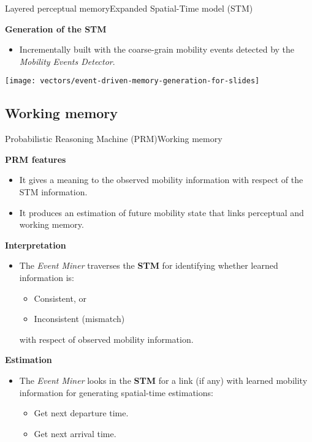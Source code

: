 \begin{frame}{Layered perceptual memory}{Expanded Spatial-Time model (STM)}
\small
\begin{block}{\small \textbf{Generation of the STM}}
\begin{itemize}
    \item Incrementally built with the coarse-grain mobility events detected by the \emph{Mobility Events Detector}.
\end{itemize}
{
  \centering
  \texttt{[image: vectors/event-driven-memory-generation-for-slides]}
  \par
}
\end{block}
\end{frame}

\subsection{Working memory}
\begin{frame}{Probabilistic Reasoning Machine (PRM)}{Working memory}
\small
\begin{block}{\small \textbf{PRM features}}
\begin{itemize}
    \item It gives a meaning to the observed mobility information with respect of the STM information.
    \item It produces an estimation of future mobility state that links perceptual and working memory.
\end{itemize}
\end{block}

\begin{block}{\small \textbf{Interpretation}}
\begin{itemize}
  \item The \emph{Event Miner} traverses the \textbf{STM} for identifying whether learned information is:
  \begin{itemize}
     \item Consistent, or
     \item Inconsistent (mismatch)
   \end{itemize}
   with respect of observed mobility information.
\end{itemize}
\end{block}

\begin{block}{\small \textbf{Estimation}}
\begin{itemize}
\item The \emph{Event Miner} looks in the \textbf{STM} for a link (if any) with learned mobility information for generating spatial-time estimations:
\begin{itemize}
  \item Get next departure time.
  \item Get next arrival time.
\end{itemize}
\end{itemize}
\end{block}

\end{frame}

